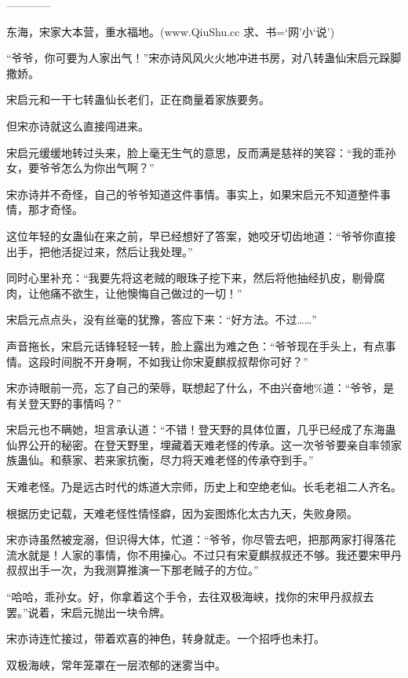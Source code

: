 
\begin{this_body}

------------

东海，宋家大本营，重水福地。(www.QiuShu.cc 求、书=‘网’小‘说’)

“爷爷，你可要为人家出气！”宋亦诗风风火火地冲进书房，对八转蛊仙宋启元跺脚撒娇。

宋启元和一干七转蛊仙长老们，正在商量着家族要务。

但宋亦诗就这么直接闯进来。

宋启元缓缓地转过头来，脸上毫无生气的意思，反而满是慈祥的笑容：“我的乖孙女，要爷爷怎么为你出气啊？”

宋亦诗并不奇怪，自己的爷爷知道这件事情。事实上，如果宋启元不知道整件事情，那才奇怪。

这位年轻的女蛊仙在来之前，早已经想好了答案，她咬牙切齿地道：“爷爷你直接出手，把他活捉过来，然后让我处理。”

同时心里补充：“我要先将这老贼的眼珠子挖下来，然后将他抽经扒皮，剔骨腐肉，让他痛不欲生，让他懊悔自己做过的一切！”

宋启元点点头，没有丝毫的犹豫，答应下来：“好方法。不过……”

声音拖长，宋启元话锋轻轻一转，脸上露出为难之色：“爷爷现在手头上，有点事情。这段时间脱不开身啊，不如我让你宋夏麒叔叔帮你可好？”

宋亦诗眼前一亮，忘了自己的荣辱，联想起了什么，不由兴奋地\%道：“爷爷，是有关登天野的事情吗？”

宋启元也不瞒她，坦言承认道：“不错！登天野的具体位置，几乎已经成了东海蛊仙界公开的秘密。在登天野里，埋藏着天难老怪的传承。这一次爷爷要亲自率领家族蛊仙。和蔡家、若来家抗衡，尽力将天难老怪的传承夺到手。”

天难老怪。乃是远古时代的炼道大宗师，历史上和空绝老仙。长毛老祖二人齐名。

根据历史记载，天难老怪性情怪癖，因为妄图炼化太古九天，失败身陨。

宋亦诗虽然被宠溺，但识得大体，忙道：“爷爷，你尽管去吧，把那两家打得落花流水就是！人家的事情，你不用操心。不过只有宋夏麒叔叔还不够。我还要宋甲丹叔叔出手一次，为我测算推演一下那老贼子的方位。”

“哈哈，乖孙女。好，你拿着这个手令，去往双极海峡，找你的宋甲丹叔叔去罢。”说着，宋启元抛出一块令牌。

宋亦诗连忙接过，带着欢喜的神色，转身就走。一个招呼也未打。

双极海峡，常年笼罩在一层浓郁的迷雾当中。


\end{this_body}
